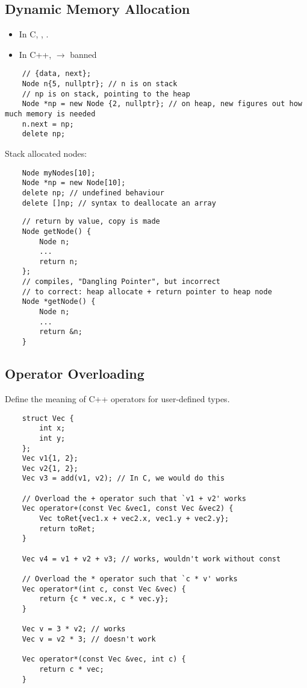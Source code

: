 \subsection{Dynamic Memory Allocation}
\begin{itemize}
    \item In C, , .
    \item In C++,  $ \rightarrow $ banned
\end{itemize}
\begin{lstlisting}
    // {data, next};
    Node n{5, nullptr}; // n is on stack
    // np is on stack, pointing to the heap
    Node *np = new Node {2, nullptr}; // on heap, new figures out how much memory is needed
    n.next = np;
    delete np;
\end{lstlisting}
Stack allocated nodes:
\begin{lstlisting}
    Node myNodes[10];
    Node *np = new Node[10];
    delete np; // undefined behaviour
    delete []np; // syntax to deallocate an array
\end{lstlisting}
\begin{lstlisting}
    // return by value, copy is made
    Node getNode() {
        Node n;
        ...
        return n;
    };
    // compiles, "Dangling Pointer", but incorrect
    // to correct: heap allocate + return pointer to heap node
    Node *getNode() {
        Node n;
        ...
        return &n;
    }
\end{lstlisting}

\subsection{Operator Overloading}
Define the meaning of C++ operators for user-defined types.
\begin{lstlisting}
    struct Vec {
        int x;
        int y;
    };
    Vec v1{1, 2};
    Vec v2{1, 2};
    Vec v3 = add(v1, v2); // In C, we would do this

    // Overload the + operator such that `v1 + v2' works
    Vec operator+(const Vec &vec1, const Vec &vec2) {
        Vec toRet{vec1.x + vec2.x, vec1.y + vec2.y};
        return toRet;
    }

    Vec v4 = v1 + v2 + v3; // works, wouldn't work without const
    
    // Overload the * operator such that `c * v' works
    Vec operator*(int c, const Vec &vec) {
        return {c * vec.x, c * vec.y};
    }

    Vec v = 3 * v2; // works
    Vec v = v2 * 3; // doesn't work
    
    Vec operator*(const Vec &vec, int c) {
        return c * vec;
    }
\end{lstlisting}

